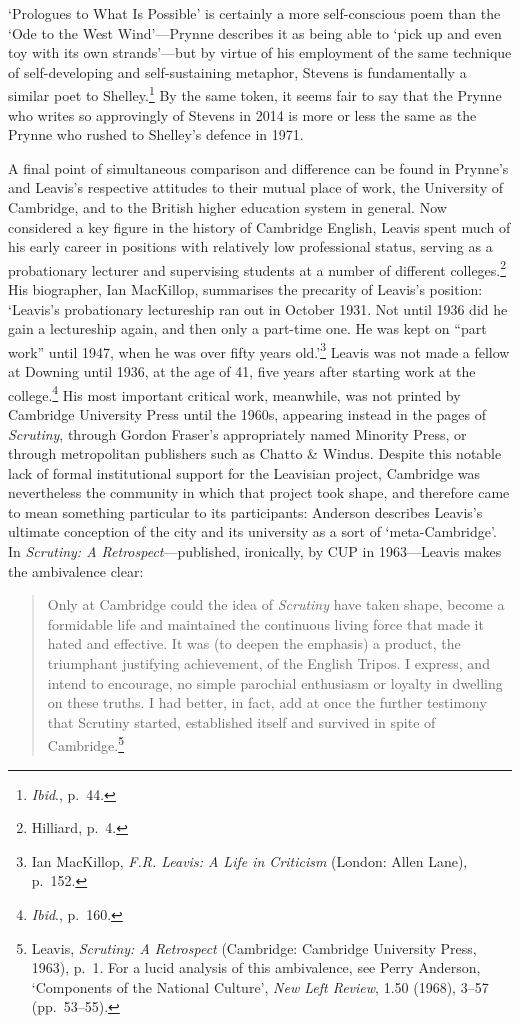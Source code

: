 \documentclass[]{article}
\begin{document}
\noindent ‘Prologues to What Is Possible’ is certainly a more
self-conscious poem than the ‘Ode to the West Wind’—Prynne describes it
as being able to ‘pick up and even toy with its own strands’—but by
virtue of his employment of the same technique of self-developing and
self-sustaining metaphor, Stevens is fundamentally a similar poet to
Shelley.\footnote{\emph{Ibid}., p.~44.} By the same token, it seems fair
to say that the Prynne who writes so approvingly of Stevens in 2014 is
more or less the same as the Prynne who rushed to Shelley’s defence in
1971.

A final point of simultaneous comparison and difference can be found in
Prynne’s and Leavis’s respective attitudes to their mutual place of
work, the University of Cambridge, and to the British higher education
system in general. Now considered a key figure in the history of
Cambridge English, Leavis spent much of his early career in positions
with relatively low professional status, serving as a probationary
lecturer and supervising students at a number of different
colleges.\footnote{Hilliard, p.~4.} His biographer, Ian MacKillop,
summarises the precarity of Leavis’s position: ‘Leavis’s probationary
lectureship ran out in October 1931. Not until 1936 did he gain a
lectureship again, and then only a part-time one. He was kept on “part
work” until 1947, when he was over fifty years old.’\footnote{Ian
  MacKillop, \emph{F.R. Leavis: A Life in Criticism} (London: Allen
  Lane), p.~152.} Leavis was not made a fellow at Downing until 1936, at
the age of 41, five years after starting work at the college.\footnote{\emph{Ibid}.,
  p.~160.} His most important critical work, meanwhile, was not printed
by Cambridge University Press until the 1960s, appearing instead in the
pages of \emph{Scrutiny}, through Gordon Fraser’s appropriately named
Minority Press, or through metropolitan publishers such as Chatto \&
Windus. Despite this notable lack of formal institutional support for
the Leavisian project, Cambridge was nevertheless the community in which
that project took shape, and therefore came to mean something particular
to its participants: Anderson describes Leavis’s ultimate conception of
the city and its university as a sort of ‘meta-Cambridge’. In
\emph{Scrutiny: A Retrospect}—published, ironically, by CUP in
1963—Leavis makes the ambivalence clear:

\begin{quote}
\singlespacing Only at Cambridge could the idea of \emph{Scrutiny} have
taken shape, become a formidable life and maintained the continuous
living force that made it hated and effective. It was (to deepen the
emphasis) a product, the triumphant justifying achievement, of the
English Tripos. I express, and intend to encourage, no simple parochial
enthusiasm or loyalty in dwelling on these truths. I had better, in
fact, add at once the further testimony that Scrutiny started,
established itself and survived in spite of Cambridge.\footnote{Leavis,
  \emph{Scrutiny: A Retrospect} (Cambridge: Cambridge University Press,
  1963), p.~1. For a lucid analysis of this ambivalence, see Perry
  Anderson, ‘Components of the National Culture’, \emph{New Left
  Review}, 1.50 (1968), 3–57 (pp.~53–55).}
\end{quote}
\end{document}
